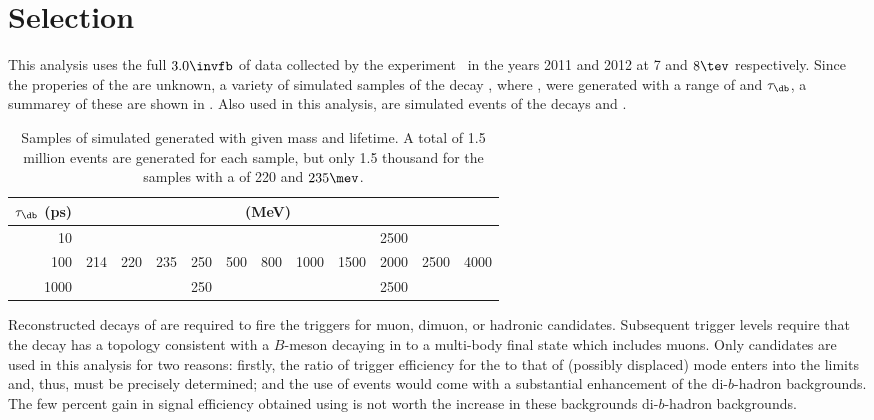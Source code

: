 \section{Selection}

This analysis uses the full $3.0\invfb$ of data collected by the \lhcb
experiment~ in the years 2011 and 2012 at 7 and $8\tev$ respectively.
Since the properies of the \db are unknown, a variety of simulated samples of the decay \btokstrdb,
where \dbtomumu, were generated with a range of \mass{\db} and $\tau_\db$, a summarey of these are
shown in .
Also used in this analysis, are simulated events of the decays \btokstrmumu and \btojpsikstr.

\begin{table}
  \caption[Samples of simulated \btokstrdb generated for the analysis]{
    Samples of simulated \btokstrdb generated with given mass and lifetime.
    A total of 1.5 million events are generated for each sample, but only 1.5 thousand for the
    samples with a \mass{\db} of 220 and $235\mev$.
  }
  \label{tab:db:samples}
  \begin{center}
    \begin{tabular}{rccccccccccc}\toprule
      $\tau_\db$ (ps) & \multicolumn{10}{c}{\mass{\db} (MeV)} \\\midrule
      10 &&&&&&&&&2500 \\
      100 &214&220&235&250&500&800&1000&1500&2000&2500&4000 \\
      1000 &&&&250&&&&&2500 \\
      \bottomrule
    \end{tabular}
  \end{center}
\end{table}

Reconstructed decays of \btokstrdb are required to fire the \lone triggers for muon, dimuon, or
hadronic candidates.
Subsequent trigger levels require that the decay has a topology consistent with a $B$-meson
decaying in to a multi-body final state which includes muons.
Only \TOS candidates are used in this analysis for two reasons: firstly, the ratio of trigger
efficiency for the \sm \btokstrmumu to that of (possibly displaced) \db mode enters
into the limits and, thus, must be precisely determined; and the use of \TIS events would
come with a substantial enhancement of the di-$b$-hadron backgrounds.
The few percent gain in signal efficiency obtained using \TIS is not worth the increase in these
backgrounds  di-$b$-hadron backgrounds.

